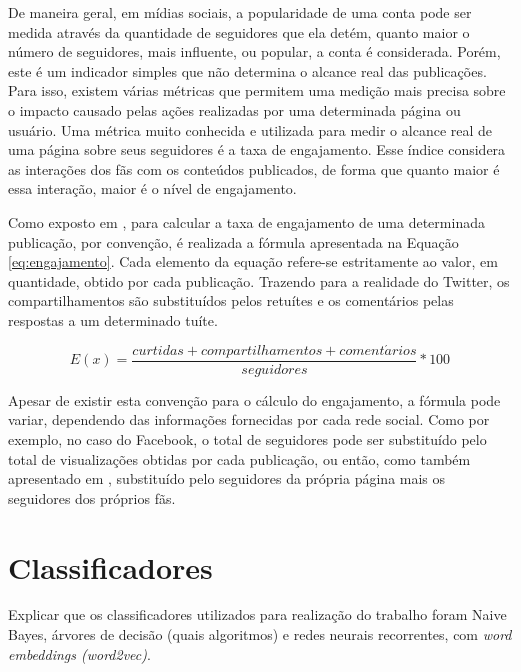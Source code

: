 \documentclass[oneside,openright,12pt]{ufsm_2015} %
\begin{document}
    \par De maneira geral, em mídias sociais, a popularidade de uma conta pode ser medida através da quantidade de seguidores que ela detém, quanto maior o número de seguidores, mais influente, ou popular, a conta é considerada. Porém, este é um indicador simples que não determina o alcance real das publicações. Para isso, existem várias métricas que permitem uma medição mais precisa sobre o impacto causado pelas ações realizadas por uma determinada página ou usuário. Uma métrica muito conhecida e utilizada para medir o alcance real de uma página sobre seus seguidores é a taxa de engajamento. Esse índice considera as interações dos fãs com os conteúdos publicados, de forma que quanto maior é essa interação, maior é o nível de engajamento.

    \par Como exposto em \cite{artigo:pillat:17}, para calcular a taxa de engajamento de uma determinada publicação, por convenção, é realizada a fórmula apresentada na Equação \ref{eq:engajamento}. Cada elemento da equação refere-se estritamente ao valor, em quantidade, obtido por cada publicação. Trazendo para a realidade do Twitter, os compartilhamentos são substituídos pelos retuítes e os comentários pelas respostas a um determinado tuíte.
    
    \begin{equation} \label{eq:engajamento}
    E(x) = \frac{curtidas + compartilhamentos + coment\acute{a}rios}{seguidores}*100
    \end{equation}
    
    \par Apesar de existir esta convenção para o cálculo do engajamento, a fórmula pode variar, dependendo das informações fornecidas por cada rede social. Como por exemplo, no caso do Facebook, o total de seguidores pode ser substituído pelo total de visualizações obtidas por cada publicação, ou então, como também apresentado em \cite{artigo:pillat:17}, substituído pelo seguidores da própria página mais os seguidores dos próprios fãs.


\section{Classificadores}
\label{sec:classificadores}

    \par Explicar que os classificadores utilizados para realização do trabalho foram Naive Bayes, árvores de decisão (quais algoritmos) e redes neurais recorrentes, com \textit{word embeddings (word2vec)}.
\end{document}
